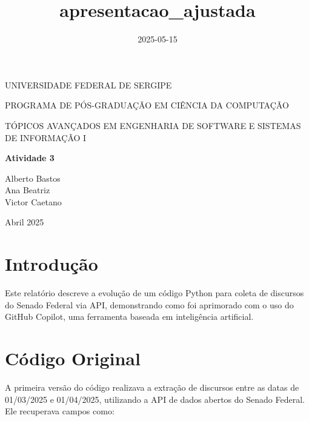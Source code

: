 \documentclass[
]{article}
\title{apresentacao\_ajustada}
\author{}
\date{\vspace{-2.5em}2025-05-15}
\begin{document}
\maketitle

{
\setcounter{tocdepth}{5}
\tableofcontents
}
\pagebreak

\begin{center}
UNIVERSIDADE FEDERAL DE SERGIPE
\end{center}
\begin{center}
PROGRAMA DE PÓS-GRADUAÇÃO EM CIÊNCIA DA COMPUTAÇÃO
\end{center}
\hfill\break
\hfill\break
\hfill\break
\hfill\break
\hfill\break
\hfill\break
\hfill\break
\hfill\break
\hfill\break
\hfill\break
\hfill\break
\hfill\break
\begin{center}
TÓPICOS AVANÇADOS EM ENGENHARIA DE SOFTWARE E SISTEMAS DE INFORMAÇÃO I
\end{center}
\begin{center}
\textbf{Atividade 3}
\end{center}
\hfill\break
\hfill\break
\begin{center}
Alberto Bastos\\
Ana Beatriz\\
Victor Caetano\\
\end{center}
\hfill\break
\hfill\break
\hfill\break
\hfill\break
\hfill\break
\hfill\break
\hfill\break
\hfill\break
\hfill\break
\hfill\break
\hfill\break
\hfill\break
\hfill\break
\hfill\break
\hfill\break
\hfill\break
\hfill\break
\hfill\break
\begin{center}
Abril 2025
\end{center}

\pagebreak

\section{Introdução}\label{introduuxe7uxe3o}

Este relatório descreve a evolução de um código Python para coleta de
discursos do Senado Federal via API, demonstrando como foi aprimorado
com o uso do GitHub Copilot, uma ferramenta baseada em inteligência
artificial.

\section{Código Original}\label{cuxf3digo-original}

A primeira versão do código realizava a extração de discursos entre as
datas de 01/03/2025 e 01/04/2025, utilizando a API de dados abertos do
Senado Federal. Ele recuperava campos como:
\end{document}
